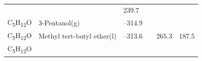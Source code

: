 \documentclass[
]{book}
\theoremstyle{definition}
\theoremstyle{definition}
\theoremstyle{definition}
\theoremstyle{remark}
\begin{document}
\begin{longtable}[]{@{}llllll@{}}
\begin{minipage}[t]{0.15\columnwidth}
\strut
\end{minipage} & \begin{minipage}[t]{0.14\columnwidth}\raggedright
\strut
\end{minipage} & \begin{minipage}[t]{0.14\columnwidth}\raggedright
239.7\strut
\end{minipage}\tabularnewline
\begin{minipage}[t]{0.07\columnwidth}\raggedright
C\textsubscript{5}H\textsubscript{12}O\strut
\end{minipage} & \begin{minipage}[t]{0.17\columnwidth}\raggedright
3-Pentanol(g)\strut
\end{minipage} & \begin{minipage}[t]{0.15\columnwidth}\raggedright
--314.9\strut
\end{minipage} & \begin{minipage}[t]{0.15\columnwidth}\raggedright
\strut
\end{minipage} & \begin{minipage}[t]{0.14\columnwidth}\raggedright
\strut
\end{minipage} & \begin{minipage}[t]{0.14\columnwidth}\raggedright
\strut
\end{minipage}\tabularnewline
\begin{minipage}[t]{0.07\columnwidth}\raggedright
C\textsubscript{5}H\textsubscript{12}O\strut
\end{minipage} & \begin{minipage}[t]{0.17\columnwidth}\raggedright
Methyl tert-butyl
ether(l)\strut
\end{minipage} & \begin{minipage}[t]{0.15\columnwidth}\raggedright
--313.6\strut
\end{minipage} & \begin{minipage}[t]{0.15\columnwidth}\raggedright
\strut
\end{minipage} & \begin{minipage}[t]{0.14\columnwidth}\raggedright
265.3\strut
\end{minipage} & \begin{minipage}[t]{0.14\columnwidth}\raggedright
187.5\strut
\end{minipage}\tabularnewline
\begin{minipage}[t]{0.07\columnwidth}\raggedright
C\textsubscript{5}H\textsubscript{12}O\strut
\end{minipage} & \begin{minipage}[t]{0.17\columnwidth}\raggedright

\end{minipage}
\end{longtable}
\end{document}
